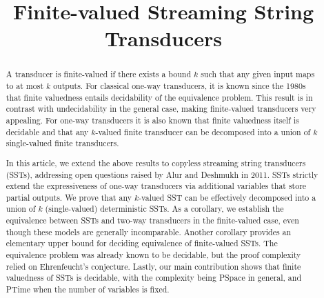 \documentclass{theoretics}
\title{Finite-valued Streaming String Transducers}
\begin{document}
\maketitle


\begin{abstract}
       A  transducer is finite-valued if there exists a bound
    $k$ such that any given
    input maps to at most $k$ outputs. For classical
    one-way transducers, it is known since the 1980s that
    finite valuedness entails decidability of the equivalence
    problem. This result is in contrast with undecidability in the
    general case, making finite-valued transducers
    very appealing. For one-way transducers it is also known that
    finite valuedness itself is decidable and that any
    $k$-valued finite transducer can be decomposed into a union of $k$
    single-valued finite transducers. 


    In this article, we extend the above results to copyless streaming string
    transducers (SSTs), addressing open questions raised by Alur and
    Deshmukh in 2011. SSTs strictly extend the expressiveness of
    one-way transducers via additional variables that store
    partial outputs. We prove that any $k$-valued SST can be
    effectively decomposed into a union of $k$ (single-valued)
    deterministic SSTs. As a corollary, we establish the equivalence
    between SSTs and two-way transducers in the finite-valued case, even though these models are generally incomparable. Another corollary provides an elementary upper bound for
    deciding equivalence of finite-valued SSTs. The equivalence problem was already
    known to be decidable, but the proof complexity relied
    on Ehrenfeucht's
    conjecture. Lastly, our main contribution shows that finite valuedness of SSTs is
    decidable, with the complexity  being {\upshape\sc PSpace} in general, and  {\upshape\sc PTime} when the
    number of variables is fixed.  
\end{abstract}

 
\end{document}
